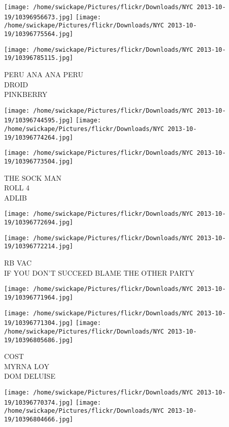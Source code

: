 \documentclass[10pt,letterpaper]{article}
\begin{document}
\texttt{[image: /home/swickape/Pictures/flickr/Downloads/NYC 2013-10-19/10396956673.jpg]}
\texttt{[image: /home/swickape/Pictures/flickr/Downloads/NYC 2013-10-19/10396775564.jpg]}

\vspace{0.25in}
\texttt{[image: /home/swickape/Pictures/flickr/Downloads/NYC 2013-10-19/10396785115.jpg]}

PERU ANA ANA PERU\\
DROID\\
PINKBERRY\\
\pagebreak

\texttt{[image: /home/swickape/Pictures/flickr/Downloads/NYC 2013-10-19/10396744595.jpg]}
\texttt{[image: /home/swickape/Pictures/flickr/Downloads/NYC 2013-10-19/10396774264.jpg]}

\texttt{[image: /home/swickape/Pictures/flickr/Downloads/NYC 2013-10-19/10396773504.jpg]}

THE SOCK MAN\\
ROLL 4\\
ADLIB\\
\pagebreak

\texttt{[image: /home/swickape/Pictures/flickr/Downloads/NYC 2013-10-19/10396772694.jpg]}

\vspace{0.25in}
\texttt{[image: /home/swickape/Pictures/flickr/Downloads/NYC 2013-10-19/10396772214.jpg]}

RB VAC\\
IF YOU DON'T SUCCEED BLAME THE OTHER PARTY\\
\pagebreak

\texttt{[image: /home/swickape/Pictures/flickr/Downloads/NYC 2013-10-19/10396771964.jpg]}

\vspace{0.25in}
\texttt{[image: /home/swickape/Pictures/flickr/Downloads/NYC 2013-10-19/10396771304.jpg]}
\texttt{[image: /home/swickape/Pictures/flickr/Downloads/NYC 2013-10-19/10396805686.jpg]}

COST\\
MYRNA LOY\\
DOM DELUISE\\
\pagebreak

\texttt{[image: /home/swickape/Pictures/flickr/Downloads/NYC 2013-10-19/10396770374.jpg]}
\texttt{[image: /home/swickape/Pictures/flickr/Downloads/NYC 2013-10-19/10396804666.jpg]}
\end{document}
